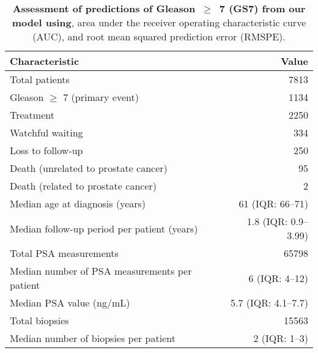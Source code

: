 \begin{table}
\small\sf\centering
\caption{\textbf{Assessment of predictions of Gleason~$\geq$~7 (GS7) from our model using}, area under the receiver operating characteristic curve (AUC), and root mean squared prediction error (RMSPE).}
\label{table:prediction_validation}
\begin{tabular}{lr}
\hline
\hline
Characteristic & Value\\
\hline
Total patients & 7813\\
Gleason $\geq$ 7 (primary event) & 1134\\
Treatment & 2250\\
Watchful waiting & 334\\
Loss to follow-up & 250\\
Death (unrelated to prostate cancer) & 95\\
Death (related to prostate cancer) & 2\\
\hline
Median age at diagnosis (years) & 61 (IQR: 66--71)\\
Median follow-up period per patient (years) &  1.8 (IQR: 0.9--3.99)\\
Total PSA measurements & 65798\\
Median number of PSA measurements per patient &  6 (IQR: 4--12)\\
Median PSA value (ng/mL) & 5.7 (IQR: 4.1--7.7)\\
Total biopsies & 15563\\
Median number of biopsies per patient &  2 (IQR: 1--3)\\
\hline
\end{tabular}
\end{table}